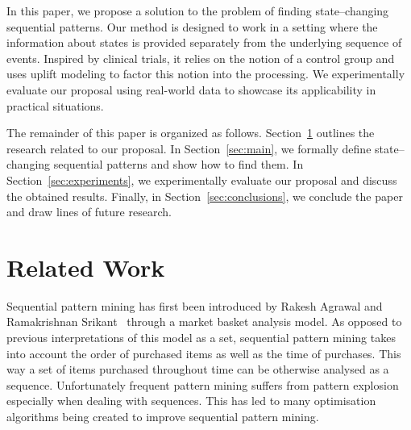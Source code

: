 \documentclass[runningheads,a4paper]{llncs}
\begin{document}
In this paper, we propose a solution to the problem of finding state--changing sequential patterns.
Our method is designed to work in a setting where the information about states is provided separately from the underlying sequence of events.
Inspired by clinical trials, it relies on the notion of a control group and uses uplift modeling to factor this notion into the processing.
We experimentally evaluate our proposal using real-world data to showcase its applicability in practical situations.

The remainder of this paper is organized as follows.
Section~\ref{sec:related} outlines the research related to our proposal.
In Section~\ref{sec:main}, we formally define state--changing sequential patterns and show how to find them.
In Section~\ref{sec:experiments}, we experimentally evaluate our proposal and discuss the obtained results.
Finally, in Section~\ref{sec:conclusions}, we conclude the paper and draw lines of future research.

\section{Related Work}
\label{sec:related}
Sequential pattern mining has first been introduced by Rakesh Agrawal and Ramakrishnan Srikant~\cite{Agrawal:1995} through a market basket analysis model.
As opposed to previous interpretations of this model as a set, sequential pattern mining takes into account the order of purchased items as well as the time of purchases.
This way a set of items purchased throughout time can be otherwise analysed as a sequence.
Unfortunately frequent pattern mining suffers from pattern explosion especially when dealing with sequences.
This has led to many optimisation algorithms being created to improve sequential pattern mining.
\end{document}

